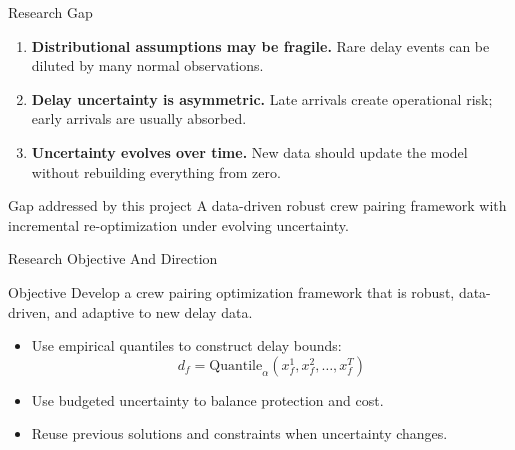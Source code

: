 \documentclass[aspectratio=169]{beamer}
\begin{document}
\begin{frame}{Research Gap}
  \begin{enumerate}
    \item \textbf{Distributional assumptions may be fragile.}
      Rare delay events can be diluted by many normal observations.
    \item \textbf{Delay uncertainty is asymmetric.}
      Late arrivals create operational risk; early arrivals are usually absorbed.
    \item \textbf{Uncertainty evolves over time.}
      New data should update the model without rebuilding everything from zero.
  \end{enumerate}

  \vspace{0.25cm}
  \begin{block}{Gap addressed by this project}
    A data-driven robust crew pairing framework with incremental re-optimization under evolving uncertainty.
  \end{block}
\end{frame}

\begin{frame}{Research Objective And Direction}
  \begin{block}{Objective}
    Develop a crew pairing optimization framework that is robust, data-driven, and adaptive to new delay data.
  \end{block}

  \vspace{0.2cm}
  \begin{itemize}
    \item Use empirical quantiles to construct delay bounds:
      \[
        d_f = \mathrm{Quantile}_{\alpha}(x_f^1, x_f^2, \ldots, x_f^T)
      \]
    \item Use budgeted uncertainty to balance protection and cost.
    \item Reuse previous solutions and constraints when uncertainty changes.
  \end{itemize}
\end{frame}
\end{document}
